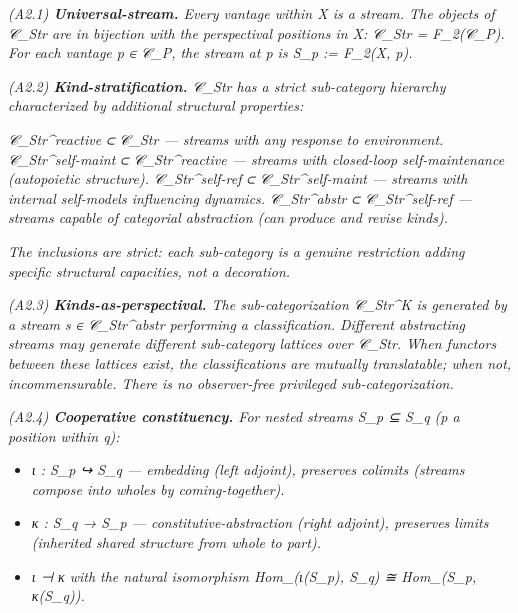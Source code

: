 \documentclass[11pt, openany]{book}
\begin{document}
\textit{(A2.1) \textbf{Universal-stream.} Every vantage within X is a stream. The objects of 𝒞\_\allowbreak{}Str are in bijection with the perspectival positions in X: 𝒞\_\allowbreak{}Str = F\_\allowbreak{}2(𝒞\_\allowbreak{}P). For each vantage p ∈ 𝒞\_\allowbreak{}P, the stream at p is S\_\allowbreak{}p := F\_\allowbreak{}2(X, p).}

\textit{(A2.2) \textbf{Kind-stratification.} 𝒞\_\allowbreak{}Str has a strict sub-category hierarchy characterized by additional structural properties:}

\textit{𝒞\_\allowbreak{}Str\textasciicircum{}reactive ⊂ 𝒞\_\allowbreak{}Str --- streams with any response to environment.}
\textit{𝒞\_\allowbreak{}Str\textasciicircum{}self-maint ⊂ 𝒞\_\allowbreak{}Str\textasciicircum{}reactive --- streams with closed-loop self-maintenance (autopoietic structure).}
\textit{𝒞\_\allowbreak{}Str\textasciicircum{}self-ref ⊂ 𝒞\_\allowbreak{}Str\textasciicircum{}self-maint --- streams with internal self-models influencing dynamics.}
\textit{𝒞\_\allowbreak{}Str\textasciicircum{}abstr ⊂ 𝒞\_\allowbreak{}Str\textasciicircum{}self-ref --- streams capable of categorial abstraction (can produce and revise kinds).}

\textit{The inclusions are strict: each sub-category is a genuine restriction adding specific structural capacities, not a decoration.}

\textit{(A2.3) \textbf{Kinds-as-perspectival.} The sub-categorization 𝒞\_\allowbreak{}Str\textasciicircum{}K is generated by a stream s ∈ 𝒞\_\allowbreak{}Str\textasciicircum{}abstr performing a classification. Different abstracting streams may generate different sub-category lattices over 𝒞\_\allowbreak{}Str. When functors between these lattices exist, the classifications are mutually translatable; when not, incommensurable. There is no observer-free privileged sub-categorization.}

\textit{(A2.4) \textbf{Cooperative constituency.} For nested streams S\_\allowbreak{}p ⊆ S\_\allowbreak{}q (p a position within q):}

\begin{itemize}
\item \textit{ι : S\_\allowbreak{}p ↪ S\_\allowbreak{}q --- embedding (left adjoint), preserves colimits (streams compose into wholes by coming-together).}
\item \textit{κ : S\_\allowbreak{}q → S\_\allowbreak{}p --- constitutive-abstraction (right adjoint), preserves limits (inherited shared structure from whole to part).}
\item \textit{ι ⊣ κ with the natural isomorphism Hom\_(ι(S\_\allowbreak{}p), S\_\allowbreak{}q) ≅ Hom\_(S\_\allowbreak{}p, κ(S\_\allowbreak{}q)).}
\end{itemize}
\end{document}
